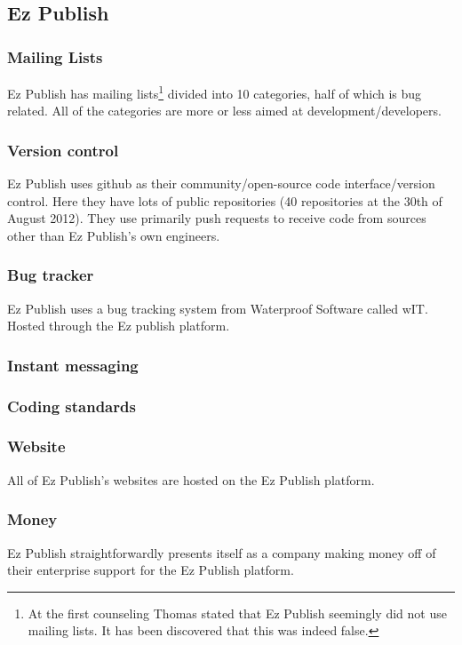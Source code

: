 \documentclass{report} %
\begin{document}
\subsection{Ez Publish}
\subsubsection{Mailing Lists}
Ez Publish has mailing lists\cite{ezpubwebmaillists}\footnote{At the first counseling Thomas stated that Ez Publish seemingly did not use mailing lists. It has been discovered that this was indeed false.} divided into 10 categories, half of which is bug related. All of the categories are more or less aimed at development/developers.
\subsubsection{Version control}
Ez Publish uses github\cite{ezpubgithub} as their community/open-source code interface/version control. Here they have lots of public repositories (40 repositories at the 30th of August 2012). They use primarily push requests to receive code from sources other than Ez Publish's own engineers. %
\subsubsection{Bug tracker}
Ez Publish uses a bug tracking system from Waterproof Software\cite{waterproofweb} called wIT\cite{waterproofwebwit}. Hosted through the Ez publish platform.
\subsubsection{Instant messaging} %
\subsubsection{Coding standards}
\subsubsection{Website}
All of Ez Publish's websites are hosted on the Ez Publish platform.
\subsubsection{Money}
Ez Publish straightforwardly presents itself as a company making money off of their enterprise support for the Ez Publish platform.
\end{document}

